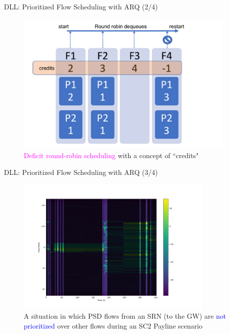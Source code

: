 \documentclass{beamer}
\begin{document}
\begin{frame}{DLL: Prioritized Flow Scheduling with ARQ (2/4)}
\begin{figure}
    \centering
    \includegraphics[width = 0.95\textwidth]{Deficit_Round_Robin_Scheduling.PNG}
    \caption{\textcolor{magenta}{Deficit round-robin scheduling} with a concept of ``credits"}
    \label{fig:11}
\end{figure}
\end{frame}
\begin{frame}{DLL: Prioritized Flow Scheduling with ARQ (3/4)}
\begin{figure}
    \centering
    \includegraphics[width = 0.85\textwidth]{PSD_without_fix_payline.png}
    \caption{A situation in which PSD flows from an SRN (to the GW) are \textcolor{blue}{not prioritized} over other flows during an SC$2$ Payline scenario}
    \label{fig:12}
\end{figure}
\end{frame}
\end{document}
